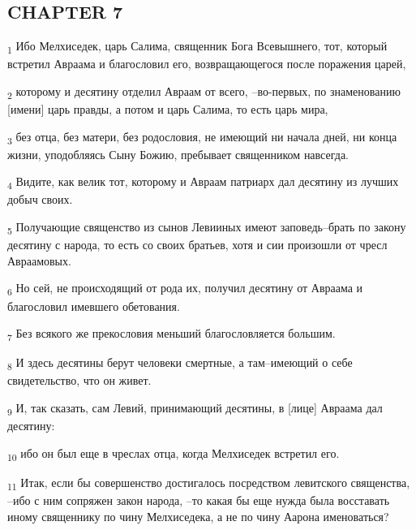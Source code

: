 \subsection{CHAPTER 7}
\begin{tcolorbox}
\textsubscript{1} Ибо Мелхиседек, царь Салима, священник Бога Всевышнего, тот, который встретил Авраама и благословил его, возвращающегося после поражения царей,
\end{tcolorbox}
\begin{tcolorbox}
\textsubscript{2} которому и десятину отделил Авраам от всего, --во-первых, по знаменованию [имени] царь правды, а потом и царь Салима, то есть царь мира,
\end{tcolorbox}
\begin{tcolorbox}
\textsubscript{3} без отца, без матери, без родословия, не имеющий ни начала дней, ни конца жизни, уподобляясь Сыну Божию, пребывает священником навсегда.
\end{tcolorbox}
\begin{tcolorbox}
\textsubscript{4} Видите, как велик тот, которому и Авраам патриарх дал десятину из лучших добыч своих.
\end{tcolorbox}
\begin{tcolorbox}
\textsubscript{5} Получающие священство из сынов Левииных имеют заповедь--брать по закону десятину с народа, то есть со своих братьев, хотя и сии произошли от чресл Авраамовых.
\end{tcolorbox}
\begin{tcolorbox}
\textsubscript{6} Но сей, не происходящий от рода их, получил десятину от Авраама и благословил имевшего обетования.
\end{tcolorbox}
\begin{tcolorbox}
\textsubscript{7} Без всякого же прекословия меньший благословляется большим.
\end{tcolorbox}
\begin{tcolorbox}
\textsubscript{8} И здесь десятины берут человеки смертные, а там--имеющий о себе свидетельство, что он живет.
\end{tcolorbox}
\begin{tcolorbox}
\textsubscript{9} И, так сказать, сам Левий, принимающий десятины, в [лице] Авраама дал десятину:
\end{tcolorbox}
\begin{tcolorbox}
\textsubscript{10} ибо он был еще в чреслах отца, когда Мелхиседек встретил его.
\end{tcolorbox}
\begin{tcolorbox}
\textsubscript{11} Итак, если бы совершенство достигалось посредством левитского священства, --ибо с ним сопряжен закон народа, --то какая бы еще нужда была восставать иному священнику по чину Мелхиседека, а не по чину Аарона именоваться?
\end{tcolorbox}

